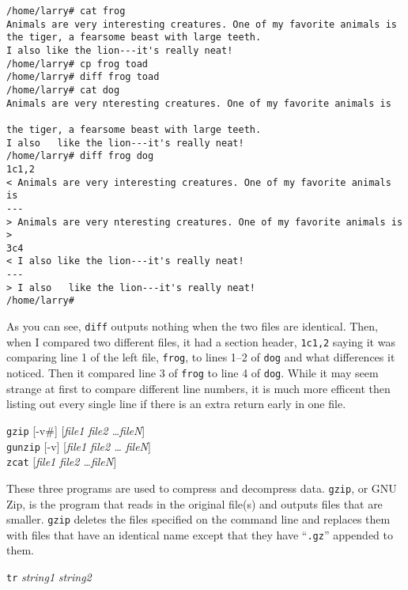 \begin{screen}\begin{verbatim}
/home/larry# cat frog
Animals are very interesting creatures. One of my favorite animals is
the tiger, a fearsome beast with large teeth.
I also like the lion---it's really neat!
/home/larry# cp frog toad
/home/larry# diff frog toad
/home/larry# cat dog
Animals are very nteresting creatures. One of my favorite animals is

the tiger, a fearsome beast with large teeth.
I also   like the lion---it's really neat!
/home/larry# diff frog dog
1c1,2
< Animals are very interesting creatures. One of my favorite animals is
---
> Animals are very nteresting creatures. One of my favorite animals is
> 
3c4
< I also like the lion---it's really neat!
---
> I also   like the lion---it's really neat!
/home/larry#
\end{verbatim}\end{screen}

As you can see, {\tt diff} outputs nothing when the two files are
identical.  Then, when I compared two different files, it had a
section header, {\tt 1c1,2} saying it was comparing line 1 of the left
file, {\tt frog}, to lines 1--2 of {\tt dog} and what differences it
noticed. Then it compared line 3 of {\tt frog} to line 4 of {\tt dog}.
While it may seem strange at first to compare different line numbers,
it is much more efficent then listing out every single line if there
is an extra return early in one file.

\begin{command}
  {\tt gzip} [-v\#] [{\sl file1 file2 \ldots fileN}]\\
  {\tt gunzip} [-v] [{\sl file1 file2 \ldots
    fileN}]\\
  {\tt zcat} [{\sl file1 file2 \ldots fileN}]
\end{command}

These three programs are used to compress and
decompress data.  {\tt gzip}, or GNU Zip, is the
program that reads in the original file(s) and outputs files that are
smaller. {\tt gzip} deletes the files specified on the command line
and replaces them with files that have an identical name except that
they have ``{\tt .gz}'' appended to them.

\begin{command}
  {\tt tr} {\sl string1} {\sl string2}
\end{command}

